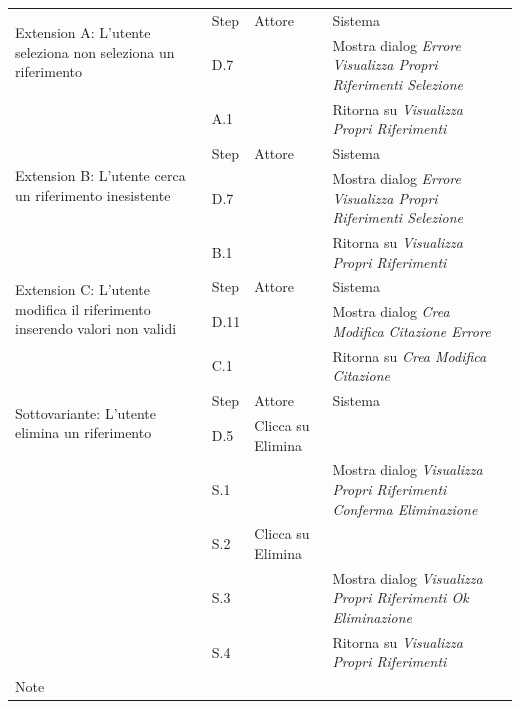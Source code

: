 \newpage

\begin{table}[H]
\def\arraystretch{1.5}
\begin{tabularx}{\linewidth}{|l|X|X|X|}
 
 \hline \multirow{2}{6cm}{Extension A: L'utente seleziona non seleziona un riferimento} & Step &
  Attore & Sistema \\
 \cline{2-4} & D.7 & & Mostra dialog \textit{Errore Visualizza Propri Riferimenti Selezione} \\
 \cline{2-4} & A.1 & & Ritorna su \textit{Visualizza Propri Riferimenti} \\
 \hline
  \multirow{2}{6cm}{Extension B: L'utente cerca un riferimento inesistente} & Step & Attore & Sistema \\
 \cline{2-4} & D.7 & & Mostra dialog \textit{Errore Visualizza Propri Riferimenti Selezione} \\
 \cline{2-4} & B.1 & & Ritorna su \textit{Visualizza Propri Riferimenti} \\
 \hline

  \multirow{2}{6cm}{Extension C: L'utente modifica il riferimento inserendo valori non validi} & Step & Attore & Sistema \\
 \cline{2-4} & D.11 & & Mostra dialog \textit{Crea Modifica Citazione Errore} \\
 \cline{2-4} & C.1 & & Ritorna su \textit{Crea Modifica Citazione} \\
 \hline 

   \multirow{2}{6cm}{Sottovariante: L'utente elimina un riferimento} & Step & Attore & Sistema \\
 \cline{2-4} & D.5 & Clicca su Elimina &  \\
 \cline{2-4} & S.1 & & Mostra dialog \textit{Visualizza Propri Riferimenti Conferma Eliminazione} \\
  \cline{2-4} & S.2 & Clicca su Elimina &  \\
   \cline{2-4} & S.3 &  & Mostra dialog \textit{Visualizza Propri Riferimenti Ok Eliminazione} \\
    \cline{2-4} & S.4 &  & Ritorna su \textit{Visualizza Propri Riferimenti}  \\



 \hline 

 Note & \multicolumn{3}{l|}{} \\
 \hline

\end{tabularx}
\end{table}

